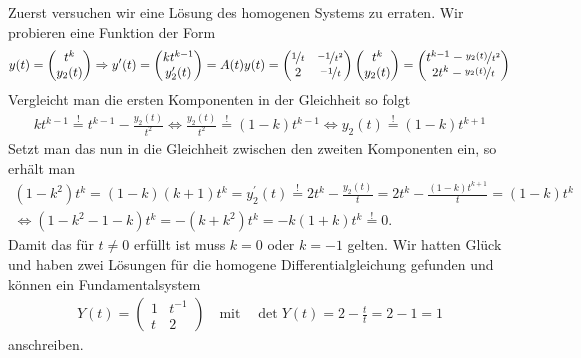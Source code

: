 \begin{solution}
    Zuerst versuchen wir eine Lösung des homogenen Systems zu erraten. Wir probieren eine Funktion der Form 
    \begin{align*}
        y(t) = \begin{pmatrix} t^k \\ y_2(t) \end{pmatrix} \Rightarrow y^\prime(t) = \begin{pmatrix} k t^{k - 1} \\ y_2^\prime(t) \end{pmatrix} = A(t) y(t) = 
        \begin{pmatrix}
            \nicefrac{1}{t} & \nicefrac{-1}{t^2} \\
            2 & \nicefrac{-1}{t}
        \end{pmatrix} 
        \begin{pmatrix} t^k \\ y_2(t) \end{pmatrix} = \begin{pmatrix} t^{k - 1} - \nicefrac{y_2(t)}{t^2} \\ 2t^k - \nicefrac{y_2(t)}{t}\end{pmatrix}
    \end{align*}
    Vergleicht man die ersten Komponenten in der Gleichheit so folgt
    \begin{align*}
        k t^{k - 1} \stackrel{!}{=} t^{k - 1} - \frac{y_2(t)}{t^2}  \Leftrightarrow \frac{y_2(t)}{t^2} \stackrel{!}{=} (1 - k) t^{k - 1} \Leftrightarrow y_2(t) \stackrel{!}{=} (1 - k) t^{k + 1}
    \end{align*}
    Setzt man das nun in die Gleichheit zwischen den zweiten Komponenten ein, so erhält man 
    \begin{align*}
        (1 - k^2) t^k = (1 - k)(k + 1) t^k = y_2^\prime(t) \stackrel{!}{=} 2 t^k  - \frac{y_2(t)}{t} = 2 t^k - \frac{(1 - k) t^{k + 1}}{t} = (1 - k) t^k \\ 
        \Leftrightarrow (1 - k^2 - 1 - k) t^k = -(k + k^2) t^k = -k (1 + k) t^k \stackrel{!}{=} 0.
    \end{align*}
    Damit das für $t \neq 0$ erfüllt ist muss $k = 0$ oder $k = -1$ gelten. Wir hatten Glück und haben zwei Lösungen für die homogene Differentialgleichung gefunden und können ein Fundamentalsystem
    \begin{align*}
        Y(t) =
        \begin{pmatrix}
            1 & t^{-1} \\
            t & 2
        \end{pmatrix}
        \quad \textrm{mit} \quad \det Y(t) = 2 - \frac{t}{t} = 2 - 1 = 1
    \end{align*}
    anschreiben. 


\end{solution}
